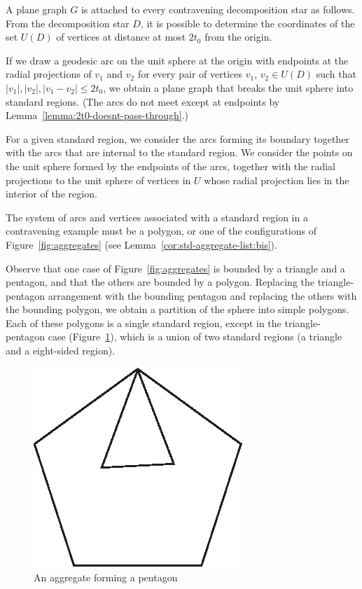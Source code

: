 A plane graph $G$ is attached to every contravening decomposition
star as follows.  From the decomposition star $D$, it is possible
to determine the coordinates of the set $U(D)$ of vertices at
distance at most $2t_0 $ from the origin.

If we draw a geodesic arc on the unit sphere at the origin with
endpoints at the radial projections of $v_1$ and $v_2$ for every
pair of vertices $v_1$, $v_2\in U(D)$ such that $|v_1|, |v_2|,
|v_1-v_2|\le 2t_0 $, we obtain a plane graph that breaks the unit
sphere into standard regions. (The arcs do not meet except at
endpoints by Lemma~\ref{lemma:2t0-doesnt-pass-through}.)

For a given standard region, we consider the arcs forming its
boundary together with the arcs that are internal to the standard
region.  We consider the points on the unit sphere formed by the
endpoints of the arcs, together with the radial projections to the
unit sphere of vertices in $U$ whose radial projection lies in the
interior of the region.

\begin{remark}
The system of arcs and vertices associated with a standard region
in a contravening example must be a polygon, or one of the
configurations of Figure~\ref{fig:aggregates} (see
Lemma~\ref{cor:std-aggregate-list:bis}).
\end{remark}


\begin{remark} \label{remark:tri-pent}
Observe that one case of Figure~\ref{fig:aggregates} is bounded by
a triangle and a pentagon, and that the others are bounded by a
polygon. Replacing the triangle-pentagon arrangement with the
bounding pentagon and replacing the others with the bounding
polygon, we obtain a partition of the sphere into simple polygons.
Each of these polygons is a single standard region, except in the
triangle-pentagon case (Figure~\ref{fig:tri-pent}), which is a
union of two standard regions (a triangle and a eight-sided
region).
\end{remark}
\begin{figure}[htb]
  \centering
  \includegraphics{PS/tripent.eps}
  \caption{An aggregate forming a pentagon}
  \label{fig:tri-pent}
\end{figure}

